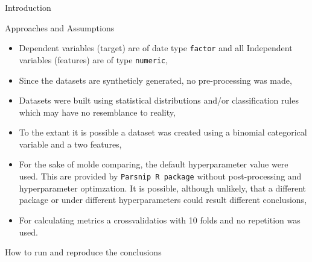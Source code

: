 \documentclass[
  ignorenonframetext,
]{article}
\begin{document}
\begin{frame}[fragile]{Introduction}
\begin{block}{Approaches and Assumptions}
\begin{itemize}
\item
  Dependent variables (target) are of date type \texttt{factor} and all Independent variables (features) are of type \texttt{numeric},
\item
  Since the datasets are syntheticly generated, no pre-processing was made,
\item
  Datasets were built using statistical distributions and/or classification rules which may have no resemblance to reality,
\item
  To the extant it is possible a dataset was created using a binomial categorical variable and a two features,
\item
  For the sake of molde comparing, the default hyperparameter value were used. This are provided by \texttt{Parsnip\ R\ package} without post-processing and hyperparameter optimzation. It is possible, although unlikely, that a different package or under different hyperparameters could result different conclusions,
\item
  For calculating metrics a crossvalidatios with 10 folds and no repetition was used.
\end{itemize}
\end{block}

\begin{block}{How to run and reproduce the conclusions}
\protect\hypertarget{how-to-run-and-reproduce-the-conclusions}{}

\end{block}
\end{frame}
\end{document}
